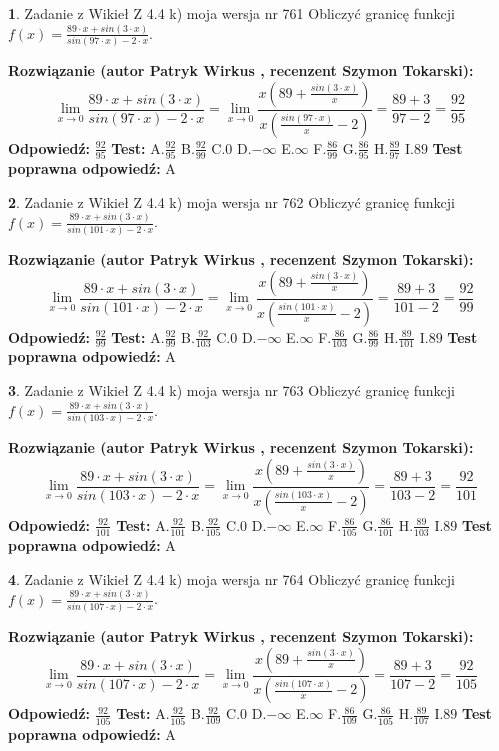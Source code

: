\documentclass[12pt, a4paper]{article}
\theoremstyle{definition} %
\newtheorem{zad}{}
\newcommand{\zadStart}[1]{\begin{zad}#1\newline}
\newcommand{\zadStop}{\end{zad}}
\newcommand{\rozwStart}[2]{\noindent \textbf{Rozwiązanie (autor #1 , recenzent #2): }\newline}
\newcommand{\rozwStop}{\newline}
\newcommand{\odpStart}{\noindent \textbf{Odpowiedź:}\newline}
\newcommand{\odpStop}{\newline}
\newcommand{\testStart}{\noindent \textbf{Test:}\newline}
\newcommand{\testStop}{\newline}
\newcommand{\kluczStart}{\noindent \textbf{Test poprawna odpowiedź:}\newline}
\newcommand{\kluczStop}{\newline}
\begin{document}
\zadStart{Zadanie z Wikieł Z 4.4 k) moja wersja nr 761}
Obliczyć granicę funkcji $f(x)=\frac{89\cdot x +sin(3\cdot x)}{sin(97\cdot x) -2\cdot x}$.
\zadStop
\rozwStart{Patryk Wirkus}{Szymon Tokarski}
$$\lim\limits_{x\to 0}\frac{89\cdot x +sin(3\cdot x)}{sin(97\cdot x) -2\cdot x}
=\lim\limits_{x\to 0}\frac{x(89+\frac{sin(3\cdot x)}{x})}{x(\frac{sin(97\cdot x)}{x}-2)}
=\frac{89+3}{97-2} = \frac{92}{95}$$
\rozwStop
\odpStart
$\frac{92}{95}$
\odpStop
\testStart
A.$\frac{92}{95}$
B.$\frac{92}{99}$
C.$0$
D.$-\infty$
E.$\infty$
F.$\frac{86}{99}$
G.$\frac{86}{95}$
H.$\frac{89}{97}$
I.$89$
\testStop
\kluczStart
A
\kluczStop



\zadStart{Zadanie z Wikieł Z 4.4 k) moja wersja nr 762}
Obliczyć granicę funkcji $f(x)=\frac{89\cdot x +sin(3\cdot x)}{sin(101\cdot x) -2\cdot x}$.
\zadStop
\rozwStart{Patryk Wirkus}{Szymon Tokarski}
$$\lim\limits_{x\to 0}\frac{89\cdot x +sin(3\cdot x)}{sin(101\cdot x) -2\cdot x}
=\lim\limits_{x\to 0}\frac{x(89+\frac{sin(3\cdot x)}{x})}{x(\frac{sin(101\cdot x)}{x}-2)}
=\frac{89+3}{101-2} = \frac{92}{99}$$
\rozwStop
\odpStart
$\frac{92}{99}$
\odpStop
\testStart
A.$\frac{92}{99}$
B.$\frac{92}{103}$
C.$0$
D.$-\infty$
E.$\infty$
F.$\frac{86}{103}$
G.$\frac{86}{99}$
H.$\frac{89}{101}$
I.$89$
\testStop
\kluczStart
A
\kluczStop



\zadStart{Zadanie z Wikieł Z 4.4 k) moja wersja nr 763}
Obliczyć granicę funkcji $f(x)=\frac{89\cdot x +sin(3\cdot x)}{sin(103\cdot x) -2\cdot x}$.
\zadStop
\rozwStart{Patryk Wirkus}{Szymon Tokarski}
$$\lim\limits_{x\to 0}\frac{89\cdot x +sin(3\cdot x)}{sin(103\cdot x) -2\cdot x}
=\lim\limits_{x\to 0}\frac{x(89+\frac{sin(3\cdot x)}{x})}{x(\frac{sin(103\cdot x)}{x}-2)}
=\frac{89+3}{103-2} = \frac{92}{101}$$
\rozwStop
\odpStart
$\frac{92}{101}$
\odpStop
\testStart
A.$\frac{92}{101}$
B.$\frac{92}{105}$
C.$0$
D.$-\infty$
E.$\infty$
F.$\frac{86}{105}$
G.$\frac{86}{101}$
H.$\frac{89}{103}$
I.$89$
\testStop
\kluczStart
A
\kluczStop



\zadStart{Zadanie z Wikieł Z 4.4 k) moja wersja nr 764}
Obliczyć granicę funkcji $f(x)=\frac{89\cdot x +sin(3\cdot x)}{sin(107\cdot x) -2\cdot x}$.
\zadStop
\rozwStart{Patryk Wirkus}{Szymon Tokarski}
$$\lim\limits_{x\to 0}\frac{89\cdot x +sin(3\cdot x)}{sin(107\cdot x) -2\cdot x}
=\lim\limits_{x\to 0}\frac{x(89+\frac{sin(3\cdot x)}{x})}{x(\frac{sin(107\cdot x)}{x}-2)}
=\frac{89+3}{107-2} = \frac{92}{105}$$
\rozwStop
\odpStart
$\frac{92}{105}$
\odpStop
\testStart
A.$\frac{92}{105}$
B.$\frac{92}{109}$
C.$0$
D.$-\infty$
E.$\infty$
F.$\frac{86}{109}$
G.$\frac{86}{105}$
H.$\frac{89}{107}$
I.$89$
\testStop
\kluczStart
A
\kluczStop
\end{document}
